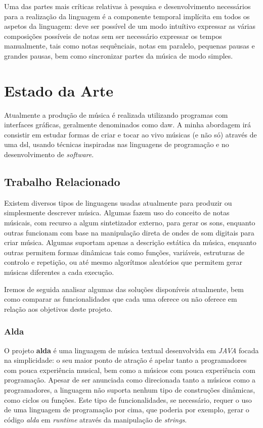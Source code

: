 \documentclass[
  oneside,
  11pt, a4paper,
  footinclude=true,
  headinclude=true,
  cleardoublepage=empty
]{scrbook}
\begin{document}
    Uma das partes mais críticas relativas à pesquisa e desenvolvimento necessários para a realização da linguagem é a componente temporal implícita em todos os aspetos da linguagem: deve ser possível de um modo intuítivo expressar as várias composições possíveis de notas sem ser necessário expressar os tempos manualmente, tais como notas sequênciais, notas em paralelo, pequenas pausas e grandes pausas, bem como sincronizar partes da música de modo simples.


	\chapter{Estado da Arte}
    Atualmente a produção de música é realizada utilizando programas com interfaces gráficas, geralmente denominados como \acrfull{daw}. A minha abordagem irá consistir em estudar formas de criar e tocar ao vivo músicas (e não só) através de uma \acrfull{dsl}, usando técnicas inspiradas nas linguagens de programação e no desenvolvimento de \textit{software}.

	\section{Trabalho Relacionado}
	Existem diversos tipos de linguagens usadas atualmente para produzir ou simplesmente descrever música. Algumas fazem uso do conceito de notas músicais, com recurso a algum sintetizador externo, para gerar os sons, enquanto outras funcionam com base na manipulação direta de ondes de som digitais para criar música. Algumas suportam apenas a descrição estática da música, enquanto outras permitem formas dinâmicas tais como funções, variáveis, estruturas de controlo e repetição, ou até mesmo algorítmos aleatórios que permitem gerar músicas diferentes a cada execução.
	
	Iremos de seguida analisar algumas das soluções disponíveis atualmente, bem como comparar as funcionalidades que cada uma oferece ou não oferece em relação aos objetivos deste projeto.
	\subsection{Alda}
	O projeto \textbf{alda}\cite{alda} é uma linguagem de música textual desenvolvida em \textit{JAVA} focada na simplicidade: o seu maior ponto de atração é apelar tanto a programadores com pouca experiência musical, bem como a músicos com pouca experiência com programação.
    Apesar de ser anunciada como direcionada tanto a músicos como a programadores, a linguagem não suporta nenhum tipo de construções dinâmicas, como ciclos ou funções. Este tipo de funcionalidades, se necessário, requer o uso de uma linguagem de programação por cima, que poderia por exemplo, gerar o código \textit{alda} em \textit{runtime} através da manipulação de \textit{strings}.
	
\end{document}
